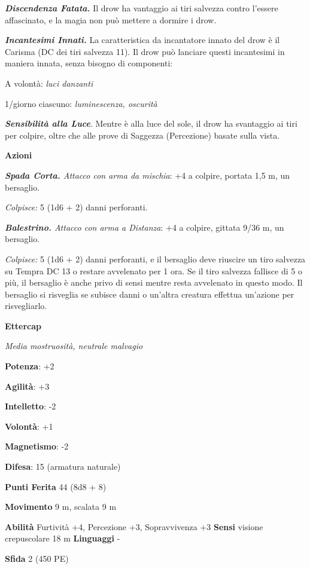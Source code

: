 \begin{multicols}{2}
\emph{\textbf{Discendenza Fatata.}} Il drow ha vantaggio ai tiri
salvezza contro l'essere affascinato, e la magia non può mettere a
dormire i drow.

\emph{\textbf{Incantesimi Innati.}} La caratteristica da incantatore
innato del drow è il Carisma (DC dei tiri salvezza 11). Il drow può
lanciare questi incantesimi in maniera innata, senza bisogno di
componenti:

A volontà: \emph{luci danzanti}

1/giorno ciascuno: \emph{luminescenza, oscurità}

\emph{\textbf{Sensibilità alla Luce}}. Mentre è alla luce del sole, il
drow ha svantaggio ai tiri per colpire, oltre che alle prove di Saggezza
(Percezione) basate sulla vista.

\textbf{Azioni}

\emph{\textbf{Spada Corta.} Attacco con arma da mischia}: +4 a colpire,
portata 1,5 m, un bersaglio.

\emph{Colpisce:} 5 (1d6 + 2) danni perforanti.

\emph{\textbf{Balestrino.} Attacco con arma a Distanza}: +4 a colpire,
gittata 9/36 m, un bersaglio.

\emph{Colpisce:} 5 (1d6 + 2) danni perforanti, e il bersaglio deve
riuscire un tiro salvezza su Tempra DC 13 o restare avvelenato per
1 ora. Se il tiro salvezza fallisce di 5 o più, il bersaglio è anche
privo di sensi mentre resta avvelenato in questo modo. Il bersaglio si
risveglia se subisce danni o un'altra creatura effettua un'azione per
risvegliarlo.



\textbf{Ettercap}

\emph{Media mostruosità, neutrale malvagio}

\textbf{Potenza}: +2

\textbf{Agilità}: +3

\textbf{Intelletto}: -2

\textbf{Volontà}: +1

\textbf{Magnetismo}: -2

\textbf{Difesa}: 15 (armatura naturale)

\textbf{Punti Ferita} 44 (8d8 + 8)

\textbf{Movimento} 9 m, scalata 9 m

\textbf{Abilità} Furtività +4, Percezione +3, Sopravvivenza +3
\textbf{Sensi} visione crepuscolare 18 m
\textbf{Linguaggi} -

\textbf{Sfida} 2 (450 PE)


\end{multicols}

